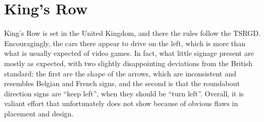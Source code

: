 \documentclass{article}
\begin{document}
\section{King's Row}
King's Row is set in the United Kingdom, and there the rules follow the TSRGD.
Encouragingly, the cars there appear to drive on the left,
which is more than what is usually expected of video games.
In fact, what little signage present are mostly as expected,
with two slightly disappointing deviations from the British standard:
the first are the shape of the arrows, which are inconsistent
and resembles Belgian and French signs,
and the second is that the roundabout direction signs are ``keep left'',
when they should be ``turn left''.
Overall, it is valiant effort that unfortunately does not show
because of obvious flaws in placement and design.
\end{document}
